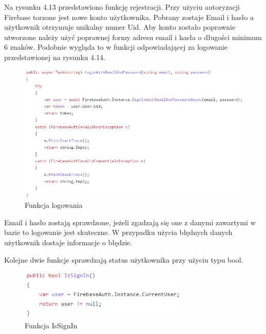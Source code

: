 Na rysunku 4.13 przedstawiono funkcję rejestracji. Przy użyciu autoryzacji Firebase torzone jest nowe konto użytkownika. Pobrany zostaje Email i hasło a użytkownik otrzymuje unikalny numer Uid. Aby konto zostało poprawnie utworzone należy użyć poprawnej formy adresu email i hasła o długości minimum 6 znaków. \newline 
Podobnie wygląda to w funkcji odpowiadającej za logowanie przedstawionej na rysunku 4.14. 

\begin{figure}[!htb]
	\begin{center}
		\includegraphics[width=16cm]{rys/authdroid2.png}
		\caption{Funkcja logowania}
		\label{rys:rysunek025}
	\end{center}
\end{figure}

Email i hasło zostają sprawdzone, jeżeli zgadzają się one z danymi zawartymi w bazie to logowanie jest skuteczne. W przypadku użycia błędnych danych użytkownik dostaje informacje o błędzie. \newline \newline

Kolejne dwie funkcje sprawdzają status użytkownika przy użyciu typu bool.

\begin{figure}[!htb]
	\begin{center}
		\includegraphics[width=8cm]{rys/authdroid3.png}
		\caption{Funkcja IsSignIn}
		\label{rys:rysunek026}
	\end{center}
\end{figure}  

